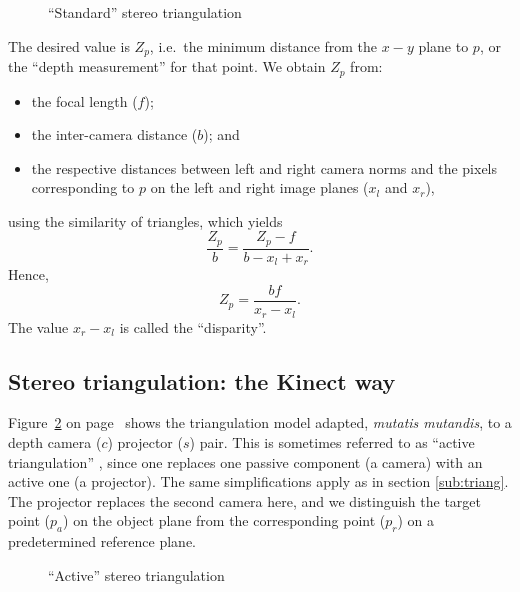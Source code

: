 \begin{figure}[ht]
    \begin{center}
        
        \caption{``Standard'' stereo triangulation}
        \label{fig:triang}
    \end{center}
\end{figure}

The desired value is $Z_{p}$, i.e.\ the minimum distance from the $x-y$ plane to
$p$, or the ``depth measurement'' for that point. We obtain $Z_{p}$ from: 

\begin{itemize}

    \item the focal length ($f$);

    \item the inter-camera distance ($b$); and 

    \item the respective distances between left and right camera norms and the
    pixels corresponding to $p$ on the left and right image planes ($x_{l}$ and
    $x_{r}$),

\end{itemize}
using the similarity of triangles, which yields
\[
    \frac{Z_p}{b} = \frac{Z_p - f}{b - x_l + x_r}.
\]
Hence,
\[
Z_p = \frac {bf}{x_r - x_l}.
\]
The value $x_r - x_l$ is called the ``disparity''.

\subsection{Stereo triangulation: the Kinect way}
\label{sub:atriang}

Figure~\ref{fig:atriang} on page~\pageref{fig:atriang} shows the triangulation
model adapted, \emph{mutatis mutandis}, to a depth camera ($c$) projector ($s$)
pair. This is sometimes referred to as ``active triangulation''
\cite{alexander1987}, since one replaces one passive component (a camera) with
an active one (a projector). The same simplifications apply as in section
\ref{sub:triang}. The projector replaces the second camera here, and we
distinguish the target point ($p_a$) on the object plane from the corresponding
point ($p_r$) on a predetermined reference plane.

\begin{figure}[ht]
    \begin{center}
        
        \caption{``Active'' stereo triangulation}
        \label{fig:atriang}
    \end{center}
\end{figure}

